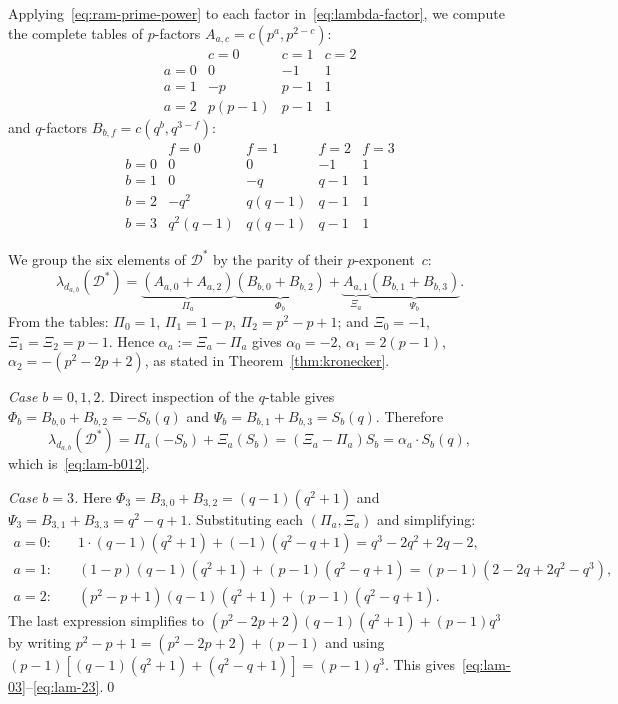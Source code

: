 \documentclass[12pt,a4paper]{article}
\theoremstyle{plain}
\theoremstyle{definition}
\newcommand{\Dstar}{\mathcal{D}^*}
\begin{document}
Applying~\eqref{eq:ram-prime-power} to each factor
in~\eqref{eq:lambda-factor}, we compute the complete tables of
$p$-factors $A_{a,c}=c(p^a,p^{2-c})$:
\[
\renewcommand{\arraystretch}{1.2}
\begin{array}{c|ccc}
  & c=0 & c=1 & c=2 \\\hline
  a=0 & 0 & -1 & 1 \\
  a=1 & -p & p-1 & 1 \\
  a=2 & p(p-1) & p-1 & 1
\end{array}
\]
and $q$-factors $B_{b,f}=c(q^b,q^{3-f})$:
\[
\renewcommand{\arraystretch}{1.2}
\begin{array}{c|cccc}
  & f=0 & f=1 & f=2 & f=3 \\\hline
  b=0 & 0 & 0 & -1 & 1 \\
  b=1 & 0 & -q & q-1 & 1 \\
  b=2 & -q^2 & q(q-1) & q-1 & 1 \\
  b=3 & q^2(q-1) & q(q-1) & q-1 & 1
\end{array}
\]

We group the six elements of $\Dstar$ by the parity of their
$p$-exponent~$c$:
\[
  \lambda_{d_{a,b}}(\Dstar)
  = \underbrace{(A_{a,0}+A_{a,2})}_{\Pi_a}
    \underbrace{(B_{b,0}+B_{b,2})}_{\Phi_b}
  + \underbrace{A_{a,1}}_{\Xi_a}
    \underbrace{(B_{b,1}+B_{b,3})}_{\Psi_b}.
\]
From the tables: $\Pi_0=1$, $\Pi_1=1-p$, $\Pi_2=p^2-p+1$; and
$\Xi_0=-1$, $\Xi_1=\Xi_2=p-1$.  Hence $\alpha_a:=\Xi_a-\Pi_a$ gives
$\alpha_0=-2$, $\alpha_1=2(p-1)$, $\alpha_2=-(p^2-2p+2)$, as stated
in Theorem~\ref{thm:kronecker}.

\textit{Case $b=0,1,2$.}  Direct inspection of the $q$-table gives
$\Phi_b=B_{b,0}+B_{b,2}=-S_b(q)$ and $\Psi_b=B_{b,1}+B_{b,3}=S_b(q)$.
Therefore
\[
  \lambda_{d_{a,b}}(\Dstar)
  = \Pi_a(-S_b)+\Xi_a(S_b) = (\Xi_a-\Pi_a)S_b = \alpha_a\cdot S_b(q),
\]
which is~\eqref{eq:lam-b012}.

\textit{Case $b=3$.}  Here $\Phi_3=B_{3,0}+B_{3,2}=(q-1)(q^2+1)$ and
$\Psi_3=B_{3,1}+B_{3,3}=q^2-q+1$.  Substituting each $(\Pi_a,\Xi_a)$
and simplifying:
\begin{align*}
  a=0:&\quad 1\cdot(q-1)(q^2+1)+(-1)(q^2-q+1) = q^3-2q^2+2q-2,\\
  a=1:&\quad (1-p)(q-1)(q^2+1)+(p-1)(q^2-q+1)
         = (p-1)(2-2q+2q^2-q^3),\\
  a=2:&\quad (p^2-p+1)(q-1)(q^2+1)+(p-1)(q^2-q+1).
\end{align*}
The last expression simplifies to
$(p^2-2p+2)(q-1)(q^2+1)+(p-1)q^3$ by writing
$p^2-p+1=(p^2-2p+2)+(p-1)$ and using
$(p-1)[(q-1)(q^2+1)+(q^2-q+1)]=(p-1)q^3$.
This gives~\eqref{eq:lam-03}--\eqref{eq:lam-23}.\qed
\end{document}
